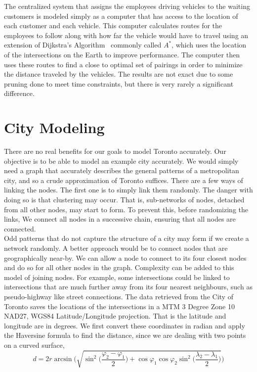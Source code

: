 \documentclass[Proceedings]{ascelike}
\begin{document}
The centralized system that assigns the employees driving vehicles to the waiting customers is modeled simply as a
computer that has access to the location of each customer and each vehicle. This computer calculates routes for the
employees to follow along with how far the vehicle would have to travel using an extension of Dijkstra's Algorithm~\cite{Dijkstra1959}
commonly called \( A^{*} \), which uses the location of the intersections on the Earth to improve performance.
The computer then uses these routes to find a close to optimal set of pairings in order to minimize the distance
traveled by the vehicles. The results are not exact due to some pruning done to meet time constraints, but there is
very rarely a significant difference.

\section*{City Modeling}

There are no real benefits for our goals to model Toronto accurately. Our objective is to be able to model an example city accurately. We would simply need a graph that accurately describes the general patterns of a metropolitan city, and so a crude approximation of Toronto suffices. There are a few ways of linking the nodes. The first one is to simply link them randomly. The danger with doing so is that clustering may occur. That is, sub-networks of nodes, detached from all other nodes, may start to form. To prevent this, before randomizing the links, We connect all nodes in a successive chain, ensuring that all nodes are connected. \\

Odd patterns that do not capture the structure of a city may form if we create a network randomly. A better approach would be to connect nodes that are geographically near-by. We can allow a node to connect to its four closest nodes and do so for all other nodes in the graph. Complexity can be added to this model of joining nodes. For example, some intersections could be linked to intersections that are much further away from its four nearest neighbours, such as pseudo-highway like street connections. The data retrieved from the City of Toronto saves the locations of the intersections in a MTM 3 Degree Zone 10 NAD27, WGS84 Latitude/Longitude projection. That is the latitude and longitude are in degrees. We first convert these coordinates in radian and apply the Haversine formula to find the distance, since we are dealing with two points on a curved surface,
\begin{equation}
    d = 2r\arcsin\Bigg(\sqrt{\sin^2\bigg(\frac{\varphi_2 - \varphi_1}{2}\bigg) + \cos\varphi_1 \cos\varphi_2 \sin^2\bigg(\frac{\lambda_2 - \lambda_1}{2}\bigg)}\Bigg)
\end{equation}
\end{document}
